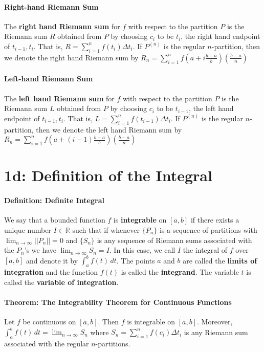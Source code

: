 \documentclass[10pt,letter]{article}
\begin{document}
\paragraph{Right-hand Riemann Sum} 
The \textbf{right hand Riemann sum} for $f$ with respect to the partition $P$ is the Riemann sum $R$ obtained from $P$ by choosing $c_i$ to be $t_i$, the right hand endpoint of ${t_{i-1},t_i}$. That is, $R=\sum_{i=1}^nf(t_i)\Delta t_i$. If $P^{(n)}$ is the regular $n$-partition, then we denote the right hand Riemann sum by $R_n=\sum_{i=1}^nf\left(a+i\frac{b-a}{b}\right)\left(\frac{b-a}{n}\right)$
\paragraph{Left-hand Riemann Sum} 
The \textbf{left hand Riemann sum} for $f$ with respect to the partition $P$ is the Riemann sum $L$ obtained from $P$ by choosing $c_i$ to be $t_{i-1}$, the left hand endpoint of ${t_{i-1},t_i}$. That is, $L=\sum_{i=1}^nf(t_{i-1})\Delta t_{i}$. If $P^{(n)}$ is the regular $n$-partition, then we denote the left hand Riemann sum by $R_n=\sum_{i=1}^nf\left(a+(i-1)\frac{b-a}{b}\right)\left(\frac{b-a}{n}\right)$

\section*{1d: Definition of the Integral}
\paragraph{Definition: Definite Integral}
We say that a bounded function $f$ is \textbf{integrable} on $[a,b]$ if there exists a unique number $I\in\mathbb{R}$ such that if whenever $\{P_n\}$ is a sequence of partitions with $\lim_{n\rightarrow\infty}||P_n||=0$ and $\{S_n\}$ is any sequence of Riemann sums associated with the $P_n$'s we have $\lim_{n\rightarrow\infty}S_n=I$. In this case, we call $I$ the integral of $f$ over $[a,b]$ and denote it by $\int_a^bf(t)\,dt$. The points $a$ and $b$ are called the \textbf{limits of integration} and the function $f(t)$ is called the \textbf{integrand}. The variable $t$ is called the \textbf{variable of integration}. 
\paragraph{Theorem: The Integrability Theorem for Continuous Functions}
Let $f$ be continuous on $[a,b]$. Then $f$ is integrable on $[a,b]$. Moreover, $\int_a^bf(t)\,dt=\lim_{n\rightarrow\infty}S_n$ where $S_n=\sum_{i=1}^nf(c_i)\Delta t_i$ is any Riemann sum associated with the regular $n$-partitions. 
\end{document}
